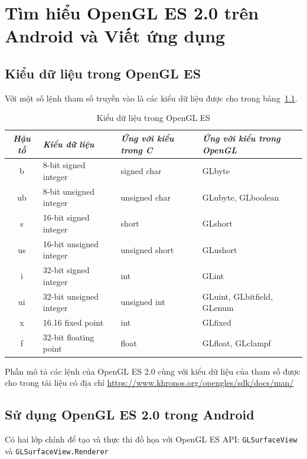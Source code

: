 \documentclass[13pt,a4paper]{extreport}
\begin{document}
\chapter{Tìm hiểu OpenGL ES 2.0 trên Android và Viết ứng dụng}
\section{Kiểu dữ liệu trong OpenGL ES}
	Với một số lệnh tham số truyền vào là các kiểu dữ liệu được cho trong bảng~\ref{Tab:kieudulieu-opengles}.
	\begin{table}[!h]
		\begin{center}
			\begin{tabular}{|c|l|l|l|}\hline
				\textit{Hậu tố} & \textit{Kiểu dữ liệu} & \textit{Ứng với kiểu trong C} & \textit{Ứng với kiểu trong OpenGL}\\ \hline
				b & 8-bit signed integer & signed char & GLbyte \\ \hline
				ub & 8-bit unsigned integer & unsigned char & GLubyte, GLboolean \\ \hline
				s & 16-bit signed integer & short & GLshort \\ \hline
				us & 16-bit unsigned integer & unsigned short & GLushort \\ \hline
				i & 32-bit signed integer & int & GLint \\ \hline
				ui & 32-bit unsigned integer & unsigned int & GLuint, GLbitfield, GLenum \\ \hline
				x & 16.16 fixed point & int & GLfixed \\ \hline
				f & 32-bit floating point & float & GLfloat, GLclampf \\ \hline
			\end{tabular}
		\end{center}
		\caption{Kiểu dữ liệu trong OpenGL ES}
		\label{Tab:kieudulieu-opengles}
	\end{table}
	
	Phần mô tả các lệnh của OpenGL ES 2.0 cùng với kiểu dữ liệu của tham số được cho trong tài liệu có địa chỉ \url{https://www.khronos.org/opengles/sdk/docs/man/}
\section{Sử dụng OpenGL ES 2.0 trong Android}
Có hai lớp chính để tạo và thực thi đồ họa với OpenGL ES API: \verb|GLSurfaceView| và \verb|GLSurfaceView.Renderer|
	
\end{document}
